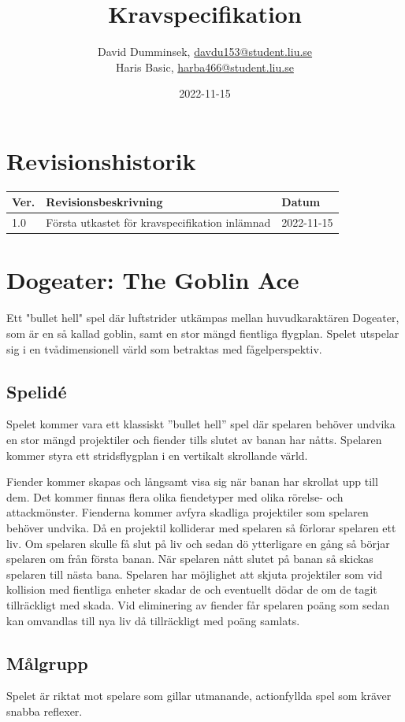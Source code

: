 \documentclass{TDP005mall}
\author{David Dumminsek, \url{davdu153@student.liu.se}\\
  Haris Basic, \url{harba466@student.liu.se}\\
  }
\title{Kravspecifikation}
\date{2022-11-15}
\begin{document}
\projectpage
\section{Revisionshistorik}
\begin{table}[!h]
\begin{tabularx}{\linewidth}{|l|X|l|}
\hline
Ver. & Revisionsbeskrivning & Datum \\\hline
1.0 & Första utkastet för kravspecifikation inlämnad & 2022-11-15 \\\hline
\end{tabularx}
\end{table}

\section{Dogeater: The Goblin Ace}

Ett "bullet hell" spel där luftstrider utkämpas mellan huvudkaraktären Dogeater, som är en så kallad goblin, samt en stor mängd fientliga flygplan.
Spelet utspelar sig i en tvådimensionell värld som betraktas med fågelperspektiv.

\subsection{Spelidé}
Spelet kommer vara ett klassiskt ''bullet hell'' spel där spelaren behöver undvika en stor mängd projektiler och fiender tills slutet av banan har nåtts. 
Spelaren kommer styra ett stridsflygplan i en vertikalt skrollande värld.

Fiender kommer skapas och långsamt visa sig när banan har skrollat upp till dem. Det kommer finnas flera olika fiendetyper med olika rörelse- och attackmönster. 
Fienderna kommer avfyra skadliga projektiler som spelaren behöver undvika. Då en projektil kolliderar med spelaren så förlorar spelaren ett liv.
Om spelaren skulle få slut på liv och sedan dö ytterligare en gång så börjar spelaren om från första banan.
När spelaren nått slutet på banan så skickas spelaren till nästa bana.
Spelaren har möjlighet att skjuta projektiler som vid kollision med fientliga enheter skadar de och eventuellt dödar de om de tagit tillräckligt med skada.
Vid eliminering av fiender får spelaren poäng som sedan kan omvandlas till nya liv då tillräckligt med poäng samlats.

\subsection{Målgrupp}
Spelet är riktat mot spelare som gillar utmanande, actionfyllda spel som kräver snabba reflexer.
\end{document}
